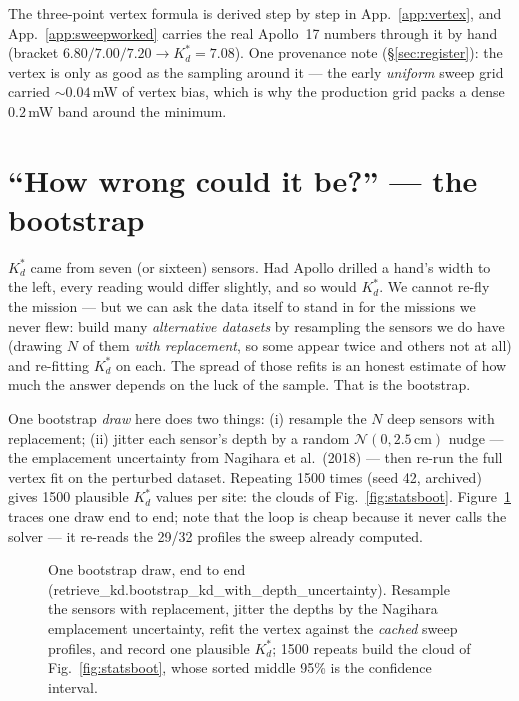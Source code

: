 \documentclass[11pt]{report}
\newcommand{\code}[1]{{\ttfamily\small #1}}
\begin{document}
The three-point vertex formula is derived step by step in
App.~\ref{app:vertex}, and App.~\ref{app:sweepworked} carries the real
Apollo~17 numbers through it by hand (bracket $6.80/7.00/7.20 \rightarrow
K_d^{*}=7.08$). One provenance note (\S\ref{sec:register}): the vertex is only
as good as the sampling around it --- the early \emph{uniform} sweep grid
carried ${\sim}0.04$\,mW of vertex bias, which is why the production grid packs
a dense $0.2$\,mW band around the minimum.

\section{``How wrong could it be?'' --- the bootstrap}\label{sec:bootzero}

\begin{plain}
$K_d^{*}$ came from seven (or sixteen) sensors. Had Apollo drilled a hand's
width to the left, every reading would differ slightly, and so would
$K_d^{*}$. We cannot re-fly the mission --- but we can ask the data itself to
stand in for the missions we never flew: build many \emph{alternative
datasets} by resampling the sensors we do have (drawing $N$ of them \emph{with
replacement}, so some appear twice and others not at all) and re-fitting
$K_d^{*}$ on each. The spread of those refits is an honest estimate of how
much the answer depends on the luck of the sample. That is the bootstrap.
\end{plain}

One bootstrap \emph{draw} here does two things: (i) resample the $N$ deep
sensors with replacement; (ii) jitter each sensor's depth by a random
$\mathcal{N}(0, 2.5\,\mathrm{cm})$ nudge --- the emplacement uncertainty from
Nagihara et al.\ (2018) --- then re-run the full vertex fit on the perturbed
dataset. Repeating 1500 times (seed 42, archived) gives 1500 plausible
$K_d^{*}$ values per site: the clouds of Fig.~\ref{fig:statsboot}.
Figure~\ref{fig:bootflow} traces one draw end to end; note that the loop is
cheap because it never calls the solver --- it re-reads the 29/32 profiles the
sweep already computed.

\begin{figure}[htbp]\centering

\caption{One bootstrap draw, end to end
(\code{retrieve\_kd.bootstrap\_kd\_with\_depth\_uncertainty}). Resample the
sensors with replacement, jitter the depths by the Nagihara emplacement
uncertainty, refit the vertex against the \emph{cached} sweep profiles, and
record one plausible $K_d^{*}$; 1500 repeats build the cloud of
Fig.~\ref{fig:statsboot}, whose sorted middle 95\% is the confidence interval.}
\label{fig:bootflow}
\end{figure}
\end{document}
